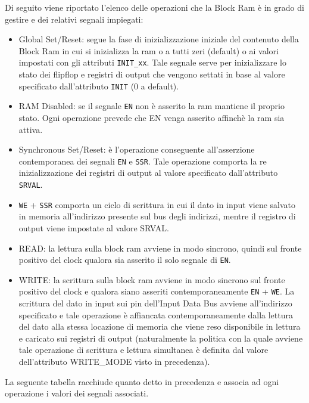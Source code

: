 Di seguito viene riportato l'elenco delle operazioni che la Block Ram  \`e in grado di gestire e dei relativi segnali impiegati:

\begin{itemize}
  \item Global Set/Reset: segue la fase di inizializzazione iniziale del contenuto della Block Ram in cui si inizializza la ram o a tutti zeri (default) o ai valori impostati con gli attributi \texttt{INIT\_xx}. Tale segnale serve per inizializzare lo stato dei flipflop e registri di output che vengono settati in base al valore specificato dall'attributo \texttt{INIT} (0 a default). 

\item RAM Disabled: se il segnale \texttt{EN} non  \`e asserito la ram mantiene il proprio stato. Ogni operazione prevede che EN venga asserito affinch\`e la ram sia attiva.

\item Synchronous Set/Reset: \`e l'operazione conseguente all'asserzione contemporanea dei segnali \texttt{EN} e \texttt{SSR}. Tale operazione comporta la re inizializzazione dei registri di output al valore specificato dall'attributo\texttt{ SRVAL}.

\item \texttt{WE} + \texttt{SSR} comporta un ciclo di scrittura in cui il dato in input viene salvato in memoria all'indirizzo presente sul bus degli indirizzi, mentre il registro di output viene impostate al valore SRVAL.

\item READ: la lettura sulla block ram avviene in modo sincrono, quindi sul fronte positivo del clock qualora sia asserito il solo segnale di \texttt{EN}.

\item WRITE: la scrittura sulla block ram avviene in modo sincrono sul fronte positivo del clock e qualora siano asseriti contemporaneamente \texttt{EN} + \texttt{WE}. La scrittura del dato in input sui pin dell'Input Data Bus avviene all'indirizzo specificato e tale operazione  \`e affiancata contemporaneamente dalla lettura del dato alla stessa locazione di memoria che viene reso disponibile in lettura e caricato sui registri di output (naturalmente la politica con la quale avviene tale operazione di scrittura e lettura simultanea  \`e definita dal valore dell'attributo WRITE\_MODE visto in precedenza).
\end{itemize}

La seguente tabella racchiude quanto detto in precedenza e associa ad ogni operazione i valori dei segnali associati.

